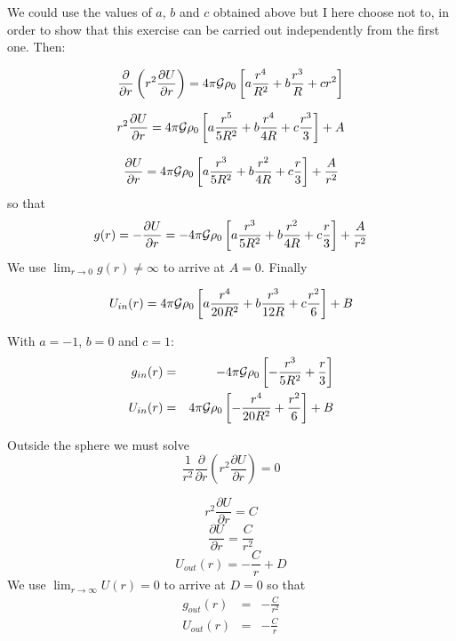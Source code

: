 We could use the values of $a$, $b$ and $c$ obtained above but I here choose not to, in order to show that 
this exercise can be carried out independently from the first one. Then: 

\begin{equation}
\frac{\partial}{\partial r} \left( r^2 \frac{\partial U}{\partial r} \right) = 4 \pi {\cal G} 
\rho_0 \left[ a \frac{r^4}{R^2}+ b \frac{r^3}{R} + c r^2 \right]
\end{equation}

\begin{equation}
r^2 \frac{\partial U}{\partial r} = 4 \pi {\cal G} \rho_0 \left[ a \frac{r^5}{5R^2}+ b \frac{r^4}{4R} + c \frac{r^3}{3} \right] + A
\end{equation}

\begin{equation}
\frac{\partial U}{\partial r} = 4 \pi {\cal G} \rho_0 \left[ a \frac{r^3}{5R^2}+ b \frac{r^2}{4R} + c \frac{r}{3} \right] + \frac{A}{r^2}
\end{equation}
so that 
\begin{equation}
g(r)=-\frac{\partial U}{\partial r} = -4 \pi {\cal G} \rho_0 \left[ a \frac{r^3}{5R^2}+ b \frac{r^2}{4R} + c \frac{r}{3} \right] + \frac{A}{r^2}
\end{equation}
We use $\lim_{r\rightarrow 0} g(r) \neq \infty$ to arrive at $A=0$.
Finally 

\begin{equation}
U_{in}(r) = 4 \pi {\cal G} \rho_0 \left[ a \frac{r^4}{20R^2}+ b \frac{r^3}{12R} + c \frac{r^2}{6} \right] + B
\end{equation}

With $a=-1$, $b=0$ and $c=1$:
\begin{eqnarray}
g_{in}(r) &=&  -4 \pi {\cal G} \rho_0 \left[ - \frac{r^3}{5R^2}+   \frac{r}{3} \right]  \\
U_{in}(r) &=& 4 \pi {\cal G} \rho_0 \left[ - \frac{r^4}{20R^2} +  \frac{r^2}{6} \right] + B
\end{eqnarray}

Outside the sphere we must solve 
\begin{equation}
\frac{1}{r^2} \frac{\partial}{\partial r} \left( r^2 \frac{\partial U}{\partial r} \right) = 0 
\end{equation}

\begin{equation}
r^2 \frac{\partial U}{\partial r}  = C 
\end{equation}
\begin{equation}
\frac{\partial U}{\partial r}  = \frac{C}{r^2}
\end{equation}
\begin{equation}
U_{out}(r) = -\frac{C}{r} + D
\end{equation}
We use $\lim_{r\rightarrow\infty}U(r)=0$ to arrive at $D=0$ so that 
\begin{eqnarray}
g_{out}(r) &=& -\frac{C}{r^2}  \\
U_{out}(r) &=& -\frac{C}{r} 
\end{eqnarray}

